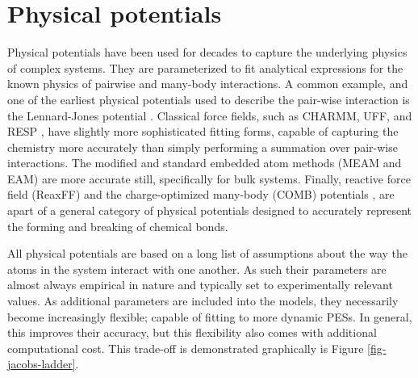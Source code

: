 \documentclass[12pt]{cmuthesis}
\begin{document}
\section{Physical potentials}
\label{sec:orged1f803}
Physical potentials have been used for decades to capture the underlying physics of complex systems. They are parameterized to fit analytical expressions for the known physics of pairwise and many-body interactions. A common example, and one of the earliest physical potentials used to describe the pair-wise interaction is the Lennard-Jones potential \cite{jones-1924-deter-molec-field}. Classical force fields, such as CHARMM, UFF, and RESP \cite{brooks-1983-charm,rappe-1992-uff,casewit-1992-applic,cornell-1995-secon-gener,cornell-1996-secon-gener}, have slightly more sophisticated fitting forms, capable of capturing the chemistry more accurately than simply performing a summation over pair-wise interactions. The modified and standard embedded atom methods (MEAM and EAM) \cite{daw-1983-semiem-quant,baskes-1992-modif} are more accurate still, specifically for bulk systems. Finally, reactive force field (ReaxFF) \cite{duin-2001-reaxf} and the charge-optimized many-body (COMB) potentials \cite{liang-2012-variab-charg}, are apart of a general category of physical potentials designed to accurately represent the forming and breaking of chemical bonds.

All physical potentials are based on a long list of assumptions about the way the atoms in the system interact with one another. As such their parameters are almost always empirical in nature and typically set to experimentally relevant values. As additional parameters are included into the models, they necessarily become increasingly flexible; capable of fitting to more dynamic PESs. In general, this improves their accuracy, but this flexibility also comes with additional computational cost. This trade-off is demonstrated graphically is Figure \ref{fig-jacobs-ladder}.
\end{document}
